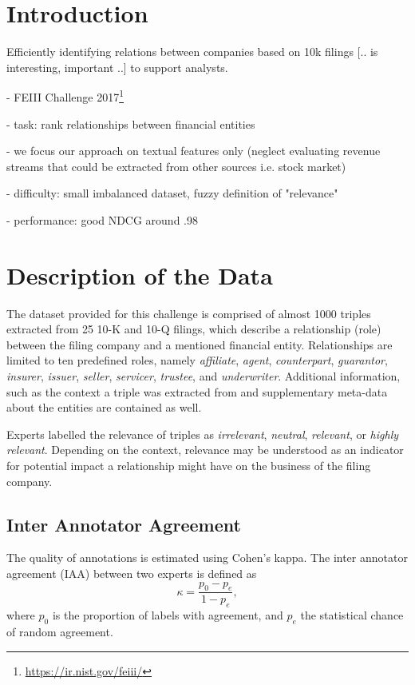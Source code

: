 \section{Introduction}
Efficiently identifying relations between companies based on 10k filings [.. is interesting, important ..] to support analysts.

- FEIII Challenge 2017\footnote{\url{https://ir.nist.gov/feiii/}}

- task: rank relationships between financial entities

- we focus our approach on textual features only (neglect evaluating revenue streams that could be extracted from other sources i.e. stock market)

- difficulty: small imbalanced dataset, fuzzy definition of "relevance"

- performance: good NDCG around .98


\section{Description of the Data}
The dataset provided for this challenge is comprised of almost 1000 triples extracted from 25 10-K and 10-Q filings, which describe a relationship (role) between the filing company and a mentioned financial entity. Relationships are limited to ten predefined roles, namely \textit{affiliate}, \textit{agent}, \textit{counterpart}, \textit{guarantor}, \textit{insurer}, \textit{issuer}, \textit{seller}, \textit{servicer}, \textit{trustee}, and \textit{underwriter}. Additional information, such as the context a triple was extracted from and supplementary meta-data about the entities are contained as well.

Experts labelled the relevance of triples as \textit{irrelevant}, \textit{neutral}, \textit{relevant}, or \textit{highly relevant}. Depending on the context, relevance may be understood as an indicator for potential impact a relationship might have on the business of the filing company. 


\subsection{Inter Annotator Agreement}
The quality of annotations is estimated using Cohen's kappa. The inter annotator agreement (IAA) between two experts is defined as
$$
\kappa = \frac{p_0-p_e}{1-p_e},
$$
where $p_0$ is the proportion of labels with agreement, and $p_e$ the statistical chance of random agreement.

